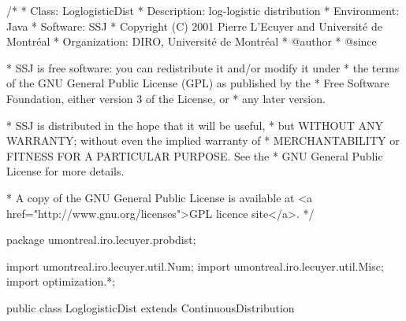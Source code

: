 \begin{code}
\begin{hide}
/*
 * Class:        LoglogisticDist
 * Description:  log-logistic distribution
 * Environment:  Java
 * Software:     SSJ
 * Copyright (C) 2001  Pierre L'Ecuyer and Université de Montréal
 * Organization: DIRO, Université de Montréal
 * @author
 * @since

 * SSJ is free software: you can redistribute it and/or modify it under
 * the terms of the GNU General Public License (GPL) as published by the
 * Free Software Foundation, either version 3 of the License, or
 * any later version.

 * SSJ is distributed in the hope that it will be useful,
 * but WITHOUT ANY WARRANTY; without even the implied warranty of
 * MERCHANTABILITY or FITNESS FOR A PARTICULAR PURPOSE.  See the
 * GNU General Public License for more details.

 * A copy of the GNU General Public License is available at
   <a href="http://www.gnu.org/licenses">GPL licence site</a>.
 */
\end{hide}
package umontreal.iro.lecuyer.probdist;
\begin{hide}
import umontreal.iro.lecuyer.util.Num;
import umontreal.iro.lecuyer.util.Misc;
import optimization.*;
\end{hide}

public class LoglogisticDist extends ContinuousDistribution\begin{hide} {
   private double alpha;
   private double beta;

   private static class Optim implements Uncmin_methods
   {
      private int n;
      private double[] xi;

      public Optim (double[] x, int n)
      {
         this.n = n;
         this.xi = new double[n];
         System.arraycopy (x, 0, this.xi, 0, n);
      }

      public double f_to_minimize (double[] p)
      {
         if ((p[1] <= 0.0) || (p[2] <= 0.0))
            return 1e200;

         double sum = 0.0;
         for (int i = 0; i < n; i++) {
	    double tmp = density (p[1], p[2], xi[i]);
            if (tmp > 0.0)
	        sum -= Math.log (tmp);
            else
	        sum += 709.0;    // log (Double.MIN_VALUE)
	 }
         return sum;
      }

      public void gradient (double[] x, double[] g)
      {
      }

      public void hessian (double[] x, double[][] h)
      {
      }
   }
\end{hide}
\end{code}
